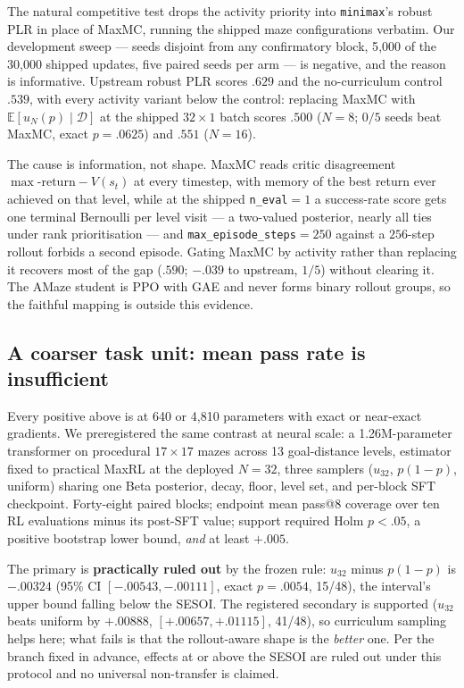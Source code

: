 The natural competitive test drops the activity priority into
\texttt{minimax}'s robust PLR \citep{plr,minimax} in place of MaxMC, running
the shipped maze configurations verbatim. Our development sweep --- seeds
disjoint from any confirmatory block, 5{,}000 of the 30{,}000 shipped updates,
five paired seeds per arm --- is negative, and the reason is informative.
Upstream robust PLR scores $.629$ and the no-curriculum control $.539$, with
every activity variant below the control: replacing MaxMC with
$\mathbb E[u_N(p)\mid\mathcal D]$ at the shipped $32{\times}1$ batch scores
$.500$ ($N{=}8$; $0/5$ seeds beat MaxMC, exact $p{=}.0625$) and $.551$
($N{=}16$).

The cause is information, not shape. MaxMC reads critic disagreement
$\max\text{-return}-V(s_t)$ at every timestep, with memory of the best return
ever achieved on that level, while at the shipped \texttt{n\_eval}${=}1$ a
success-rate score gets one terminal Bernoulli per level visit --- a
two-valued posterior, nearly all ties under rank prioritisation --- and
\texttt{max\_episode\_steps}${=}250$ against a $256$-step rollout forbids a
second episode. Gating MaxMC by activity rather than replacing it recovers
most of the gap ($.590$; $-.039$ to upstream, $1/5$) without clearing it. The AMaze student is PPO with
GAE and never forms binary rollout groups, so the faithful mapping is outside
this evidence.

\subsection{A coarser task unit: mean pass rate is insufficient}
\label{sec:mazescore}

Every positive above is at 640 or 4{,}810 parameters with exact or
near-exact gradients. We preregistered the same contrast at neural scale: a
1.26M-parameter transformer on procedural $17\times17$ mazes across 13
goal-distance levels, estimator fixed to practical MaxRL at the deployed
$N=32$, three samplers ($u_{32}$, $p(1-p)$, uniform) sharing one Beta
posterior, decay, floor, level set, and per-block SFT checkpoint. Forty-eight
paired blocks; endpoint mean pass@8 coverage over ten RL evaluations minus its
post-SFT value; support required Holm $p<.05$, a positive bootstrap lower
bound, \emph{and} at least $+.005$.

The primary is \textbf{practically ruled out} by the frozen rule: $u_{32}$
minus $p(1-p)$ is $-.00324$ (95\% CI $[-.00543,-.00111]$, exact $p=.0054$,
15/48), the interval's upper bound falling below the SESOI. The registered
secondary is supported ($u_{32}$ beats uniform by $+.00888$,
$[+.00657,+.01115]$, 41/48), so curriculum sampling helps here; what fails is
that the rollout-aware shape is the \emph{better} one. Per the branch fixed in
advance, effects at or above the SESOI are ruled out under this protocol and
no universal non-transfer is claimed.



